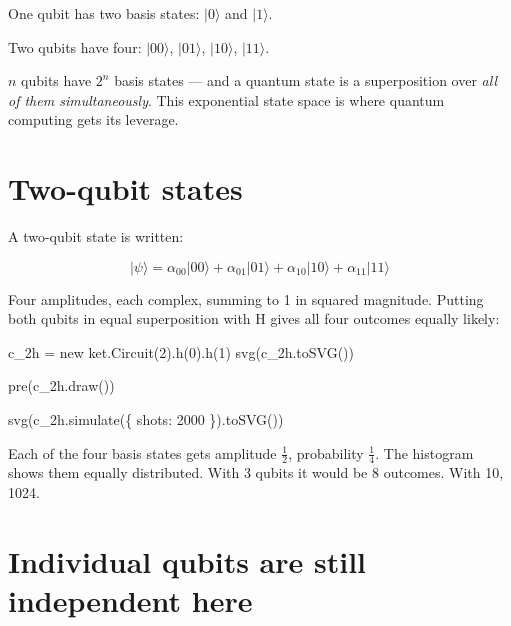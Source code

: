 \documentclass[
  11pt,
  letterpaper,
  oneside]{scrbook}
\newenvironment{Shaded}{\begin{snugshade}}{\end{snugshade}}
\newcommand{\NormalTok}[1]{\textcolor[rgb]{0.00,0.23,0.31}{#1}}
\begin{document}
One qubit has two basis states: \(|0\rangle\) and \(|1\rangle\).

Two qubits have four: \(|00\rangle\), \(|01\rangle\), \(|10\rangle\),
\(|11\rangle\).

\(n\) qubits have \(2^n\) basis states --- and a quantum state is a
superposition over \emph{all of them simultaneously}. This exponential
state space is where quantum computing gets its leverage.

\section{Two-qubit states}\label{two-qubit-states}

A two-qubit state is written:

\[|\psi\rangle = \alpha_{00}|00\rangle + \alpha_{01}|01\rangle + \alpha_{10}|10\rangle + \alpha_{11}|11\rangle\]

Four amplitudes, each complex, summing to 1 in squared magnitude.
Putting both qubits in equal superposition with H gives all four
outcomes equally likely:

\begin{Shaded}
\begin{Highlighting}[]
\NormalTok{c\_2h = new ket.Circuit(2).h(0).h(1)}
\NormalTok{svg(c\_2h.toSVG())}
\end{Highlighting}
\end{Shaded}

\begin{Shaded}
\begin{Highlighting}[]
\NormalTok{pre(c\_2h.draw())}
\end{Highlighting}
\end{Shaded}

\begin{Shaded}
\begin{Highlighting}[]
\NormalTok{svg(c\_2h.simulate(\{ shots: 2000 \}).toSVG())}
\end{Highlighting}
\end{Shaded}

Each of the four basis states gets amplitude \(\frac{1}{2}\),
probability \(\frac{1}{4}\). The histogram shows them equally
distributed. With 3 qubits it would be 8 outcomes. With 10, 1024.

\section{Individual qubits are still independent
here}\label{individual-qubits-are-still-independent-here}
\end{document}
